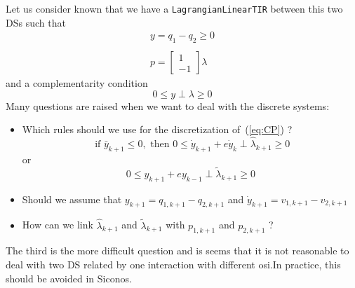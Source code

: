 Let us consider known that we have a {\tt LagrangianLinearTIR} between this two DSs such that
\begin{equation}
  \label{eq:LTIR-2DS}
  \begin{array}{l}
  y = q_1-q_2 \geq 0 \\ \\
  p = \left[
  \begin{array}{c}
    1 \\
    -1
  \end{array}\right] \lambda
\end{array}
\end{equation}
and a complementarity condition
\begin{equation}
  \label{eq:CP}
  0\leq y \perp \lambda \geq 0
\end{equation}
Many questions are raised when we want to deal with the discrete systems:
\begin{itemize}
\item Which rules should we use for the discretization of~(\ref{eq:CP}) ?
  \begin{equation}
    \label{eq:CP-TS1}
    \text{ if } \bar y_{k+1}\leq 0, \text{ then }  0\leq \dot y _{k+1} + e \dot y_{k} \perp \hat \lambda_{k+1}\geq 0
  \end{equation}
  or
  \begin{equation}
    \label{eq:CP-TS2}
    0\leq y _{k+1} + e y_{k-1} \perp \tilde \lambda_{k+1}\geq 0
  \end{equation}
\item Should we assume that $y_{k+1} = q_{1,k+1}-q_{2,k+1}$ and $\dot y_{k+1} = v_{1,k+1}-v_{2,k+1}$
\item How can we link $\hat \lambda_{k+1}$ and  $\tilde \lambda_{k+1}$ with $p_{1,k+1}$ and $p_{2,k+1}$ ?
\end{itemize}

The third is the more difficult question and is seems that it is not reasonable to deal with two DS related by one interaction with different osi.In practice, this should be avoided in Siconos.




